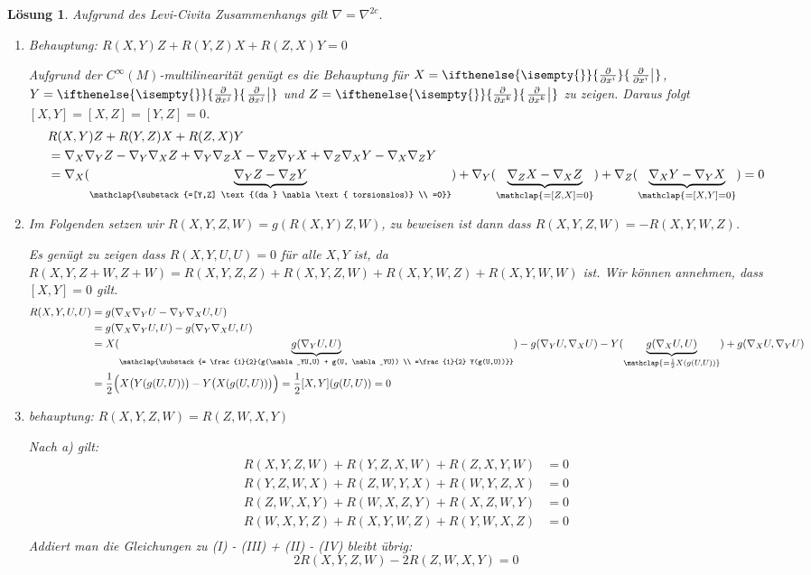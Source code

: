 \documentclass[paper=A4, twoside, chapterprefix=true, bibliography=totoc, headsepline]{scrbook}
\newcommand{\pdifffrac}[3][]{\ifthenelse{\isempty{#1}}{\frac{\partial #2}{\partial #3}}{\left. \frac{\partial #2}{\partial #3} \right|_{#1}}}
\theoremstyle{plain}
\theoremstyle{nonumberplain}
\theoremstyle{empty}
\theoremstyle{break}
\newtheorem{Loes}{L\"osung}
\begin{document}
\begin{Loes}
Aufgrund des Levi-Civita Zusammenhangs gilt $\nabla = \nabla^{2c}$.
\begin{enumerate}[label=\alph*),leftmargin=*,widest=b]
\item
	\emph{Behauptung:} $R(X,Y)Z + R(Y,Z)X + R(Z,X)Y = 0$
	
	Aufgrund der $C^\infty(M)$-multilinearit\"at gen\"ugt es die Behauptung f\"ur $X=\pdifffrac{}{x^{i}}$, $Y=\pdifffrac{}{x^{j}}$ und $Z=\pdifffrac{}{x^{k}}$ zu zeigen. Daraus folgt $[X,Y] = [X,Z] = [Y,Z] = 0$.
	\begin{align*}
		{}&R(X,Y)Z + R(Y,Z)X + R(Z,X)Y\\
		{}&= \nabla_X\nabla_Y Z - \nabla_Y\nabla_X Z + \nabla_Y\nabla_Z X - \nabla_Z\nabla_Y X + \nabla_Z\nabla_X Y - \nabla_X\nabla_Z Y\\
		{}&= \nabla_X(\underbrace{\nabla_YZ-\nabla_ZY}_{\mathclap{\substack{=[Y,Z] \text{(da } \nabla \text{ torsionslos)} \\ =0}}}) + \nabla_Y(\underbrace{\nabla_ZX-\nabla_XZ}_{\mathclap{=[Z,X]=0}}) + \nabla_Z(\underbrace{\nabla_XY-\nabla_YX}_{\mathclap{=[X,Y]=0}}) = 0
	\end{align*}
\item
	Im Folgenden setzen wir $R(X,Y,Z,W) = g(R(X,Y)Z,W)$, zu beweisen ist dann dass $R(X,Y,Z,W) = -R(X,Y,W,Z)$.
	
	Es gen\"ugt zu zeigen dass $R(X,Y,U,U) = 0$ f\"ur alle $X,Y$ ist, da $R(X,Y,Z+W,Z+W) = R(X,Y,Z,Z) + R(X,Y,Z,W) + R(X,Y,W,Z) + R(X,Y,W,W)$ ist. Wir k\"onnen annehmen, dass $[X,Y] = 0$ gilt.
	\begin{align*}
		R(X,Y,U,U) &= g(\nabla_X\nabla_YU - \nabla_Y\nabla_XU, U)\\
		&= g(\nabla_X\nabla_YU, U) - g(\nabla_Y\nabla_XU, U)\\
		&= X(\underbrace{g(\nabla_YU, U)}_{\mathclap{\substack{= \frac{1}{2}(g(\nabla_YU,U) + g(U, \nabla_YU)) \\ =\frac{1}{2} Y(g(U,U))}}}) - g(\nabla_YU, \nabla_XU) - Y(\underbrace{g(\nabla_XU, U)}_{\mathclap{=\frac{1}{2}X(g(U,U))}}) + g(\nabla_XU, \nabla_YU)\\
		&= \frac{1}{2} \Big( X\big(Y(g(U,U))\big) - Y\big(X(g(U,U))\big) \Big) = \frac{1}{2} [X,Y] (g(U,U)) = 0
	\end{align*}
\item
	\emph{behauptung:} $R(X,Y,Z,W) = R(Z,W,X,Y)$
	
	Nach a) gilt:
	\begin{align*}
		R(X,Y,Z,W) + R(Y,Z,X,W) + R(Z,X,Y,W) &= 0 \tag{I}\\
		R(Y,Z,W,X) + R(Z,W,Y,X) + R(W,Y,Z,X) &= 0 \tag{II}\\
		R(Z,W,X,Y) + R(W,X,Z,Y) + R(X,Z,W,Y) &= 0 \tag{III}\\
		R(W,X,Y,Z) + R(X,Y,W,Z) + R(Y,W,X,Z) &= 0 \tag{IV}\\
	\end{align*}
	Addiert man die Gleichungen zu (I) - (III) + (II) - (IV) bleibt \"ubrig:
		\[ 2 R(X,Y,Z,W) - 2 R(Z,W,X,Y) = 0 \]
\end{enumerate}\end{Loes}
\end{document}
